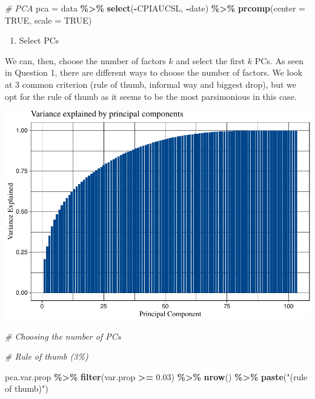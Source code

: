 \documentclass[
]{article}
\newenvironment{Shaded}{\begin{snugshade}}{\end{snugshade}}
\newcommand{\AttributeTok}[1]{\textcolor[rgb]{0.13,0.29,0.53}{#1}}
\newcommand{\CommentTok}[1]{\textcolor[rgb]{0.56,0.35,0.01}{\textit{#1}}}
\newcommand{\ConstantTok}[1]{\textcolor[rgb]{0.56,0.35,0.01}{#1}}
\newcommand{\FloatTok}[1]{\textcolor[rgb]{0.00,0.00,0.81}{#1}}
\newcommand{\FunctionTok}[1]{\textcolor[rgb]{0.13,0.29,0.53}{\textbf{#1}}}
\newcommand{\NormalTok}[1]{#1}
\newcommand{\OtherTok}[1]{\textcolor[rgb]{0.56,0.35,0.01}{#1}}
\newcommand{\SpecialCharTok}[1]{\textcolor[rgb]{0.81,0.36,0.00}{\textbf{#1}}}
\newcommand{\StringTok}[1]{\textcolor[rgb]{0.31,0.60,0.02}{#1}}
\providecommand{\tightlist}{%
  \setlength{\itemsep}{0pt}\setlength{\parskip}{0pt}}
\begin{document}
\begin{Shaded}
\begin{Highlighting}[]
\CommentTok{\# PCA}
\NormalTok{pca }\OtherTok{=}\NormalTok{ data }\SpecialCharTok{\%\textgreater{}\%}
    \FunctionTok{select}\NormalTok{(}\SpecialCharTok{{-}}\NormalTok{CPIAUCSL, }\SpecialCharTok{{-}}\NormalTok{date) }\SpecialCharTok{\%\textgreater{}\%}
    \FunctionTok{prcomp}\NormalTok{(}\AttributeTok{center =} \ConstantTok{TRUE}\NormalTok{, }\AttributeTok{scale =} \ConstantTok{TRUE}\NormalTok{)}
\end{Highlighting}
\end{Shaded}

\begin{enumerate}
\def\labelenumi{\arabic{enumi}.}
\setcounter{enumi}{1}
\tightlist
\item
  Select PCs
\end{enumerate}

We can, then, choose the number of factors \(k\) and select the first
\(k\) PCs. As seen in Question 1, there are different ways to choose the
number of factors. We look at 3 common criterion (rule of thumb,
informal way and biggest drop), but we opt for the rule of thumb as it
seems to be the most parsimonious in this case.

\includegraphics{Trabalho_Econo4_Q2_files/figure-latex/unnamed-chunk-11-1.pdf}

\begin{Shaded}
\begin{Highlighting}[]
\CommentTok{\# Choosing the number of PCs}

\CommentTok{\# Rule of thumb (3\%)}

\NormalTok{pca.var.prop }\SpecialCharTok{\%\textgreater{}\%}
    \FunctionTok{filter}\NormalTok{(var.prop }\SpecialCharTok{\textgreater{}=} \FloatTok{0.03}\NormalTok{) }\SpecialCharTok{\%\textgreater{}\%}
    \FunctionTok{nrow}\NormalTok{() }\SpecialCharTok{\%\textgreater{}\%}
    \FunctionTok{paste}\NormalTok{(}\StringTok{"(rule of thumb)"}\NormalTok{)}
\end{Highlighting}
\end{Shaded}
\end{document}
